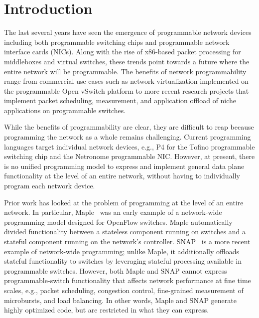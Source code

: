 \section{Introduction}
The last several years have seen the emergence of programmable network devices
including both programmable switching chips and programmable network interface
cards (NICs). Along with the rise of x86-based packet processing for
middleboxes and virtual switches, these trends point towards a future where the
entire network will be programmable. The benefits of network programmability
range from commercial use cases such as network virtualization implemented on
the programmable Open vSwitch platform to more recent research projects that
implement packet scheduling, measurement, and application offload of niche
applications on programmable switches.

While the benefits of programmability are clear, they are difficult to reap
because programming the network as a whole remains challenging. Current
programming languages target individual network devices, e.g., P4 for the
Tofino programmable switching chip and the Netronome programmable NIC. However,
at present, there is no unified programming model to express and implement
general data plane functionality at the level of an entire network, without
having to individually program each network device.

Prior work has looked at the problem of programming at the level of an entire
network. In particular, Maple~\cite{maple} was an early example of a
network-wide programming model designed for OpenFlow switches. Maple
automatically divided functionality between a stateless component running on
switches and a stateful component running on the network's controller.
SNAP~\cite{snap} is a more recent example of network-wide programming; unlike
Maple, it additionally offloads stateful functionality to switches by
leveraging stateful processing available in programmable switches.  However,
both Maple and SNAP cannot express programmable-switch functionality that
affects network performance at fine time scales, e.g., packet scheduling,
congestion control, fine-grained measurement of microbursts, and load
balancing. In other words, Maple and SNAP generate highly optimized code, but
are restricted in what they can express.

